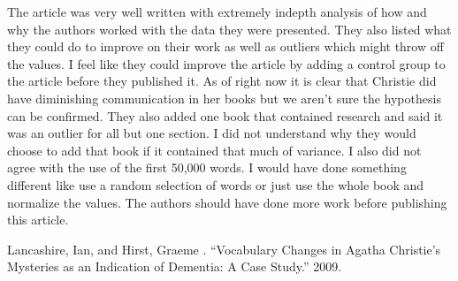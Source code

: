 \documentclass[journal, a4paper]{IEEEtran}
\begin{document}
The article was very well written with extremely indepth analysis of how and why the authors worked with the data they were presented. They also listed what they could do to improve on their work as well as outliers which might throw off the values. I feel like they could improve the article by adding a control group to the article before they published it. As of right now it is clear that Christie did have diminishing communication in her books but we aren't sure the hypothesis can be confirmed. They also added one book that contained research and said it was an outlier for all but one section. I did not understand why they would choose to add that book if it contained that much of variance. I also did not agree with the use of the first 50,000 words. I would have done something different like use a random selection of words or just use the whole book and normalize the values. The authors should have done more work before publishing this article.

\begin{thebibliography}{5}

	 Lancashire, Ian, and Hirst, Graeme . “Vocabulary Changes in Agatha Christie’s Mysteries as an Indication of Dementia: A Case Study.” 2009.
\end{thebibliography}

\end{document}
